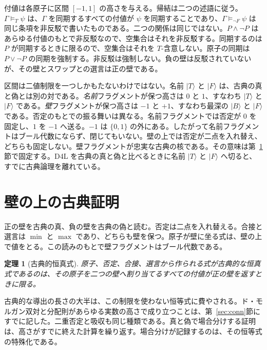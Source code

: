 \documentclass[a4paper]{article}
\newtheorem{theorem}{定理}[section]
\theoremstyle{definition}
\begin{document}
付値は各原子に区間 \([-1,1]\) の高さを与える。帰結は二つの述語に従う。\(\Gamma\models_T\psi\) は、\(\Gamma\) を同期するすべての付値が \(\psi\) を同期することであり、\(\Gamma\models_{\lnot F}\psi\) は同じ条項を非反駁で書いたものである。二つの関係は同じではない。\(P\wedge\neg P\) はあらゆる付値のもとで非反駁なので、空集合はそれを非反駁する。同期するのは \(P\) が同期するときに限るので、空集合はそれを \(T\)-含意しない。原子の同期は \(P\vee\neg P\) の同期を強制する。非反駁は強制しない。負の壁は反駁されていないが、その壁とスワップとの選言は正の壁である。

区間は二値制限を一つしかもたないわけではない。名前 \(\lvert T\rangle\) と \(\lvert F\rangle\) は、古典の真と偽とは別の対である。\emph{名前}フラグメントが保つ高さは \(0\) と \(1\)、すなわち \(\lvert T\rangle\) と \(\lvert F\rangle\) である。\emph{壁}フラグメントが保つ高さは \(-1\) と \(+1\)、すなわち最深の \(\lvert B\rangle\) と \(\lvert F\rangle\) である。否定のもとでの振る舞いは異なる。名前フラグメントでは否定が \(0\) を固定し、\(1\) を \(-1\) へ送る。\(-1\) は \(\{0,1\}\) の外にある。したがって名前フラグメントはブール代数にならず、閉じてもいない。壁の上では否定が二点を入れ替え、どちらも固定しない。壁フラグメントが忠実な古典の核である。その意味は第~\ref{sec:wall}節で固定する。D4L を古典の真と偽と比べるときに名前 \(\lvert T\rangle\) と \(\lvert F\rangle\) へ切ると、すでに古典論理を離れている。

\section{壁の上の古典証明}
\label{sec:wall}

正の壁を古典の真、負の壁を古典の偽と読む。否定は二点を入れ替える。合接と選言は \(\min\) と \(\max\) であり、どちらも壁を保つ。原子が壁に坐る式は、壁の上で値をとる。この読みのもとで壁フラグメントはブール代数である。

\begin{theorem}[古典的恒真式]
\label{thm:wall}
原子、否定、合接、選言から作られる式が古典的な恒真式であるのは、その原子を二つの壁へ割り当てるすべての付値が正の壁を返すときに限る。
\end{theorem}

古典的な導出の長さの大半は、この制限を使わない恒等式に費やされる。ド・モルガン双対と分配則があらゆる実数の高さで成り立つことは、第~\ref{sec:conn}節にすでに記した。二重否定と吸収も同じ種類である。真と偽で場合分けする証明は、高さがすでに終えた計算を繰り返す。場合分けが記録するのは、その恒等式の特殊化である。
\end{document}
